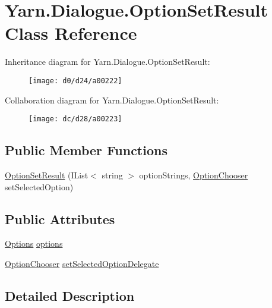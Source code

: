 \hypertarget{a00060}{\section{Yarn.\-Dialogue.\-Option\-Set\-Result Class Reference}
\label{a00060}
}


Inheritance diagram for Yarn.\-Dialogue.\-Option\-Set\-Result\-:
\nopagebreak
\begin{figure}[H]
\begin{center}
\leavevmode
\texttt{[image: d0/d24/a00222]}
\end{center}
\end{figure}


Collaboration diagram for Yarn.\-Dialogue.\-Option\-Set\-Result\-:
\nopagebreak
\begin{figure}[H]
\begin{center}
\leavevmode
\texttt{[image: dc/d28/a00223]}
\end{center}
\end{figure}
\subsection*{Public Member Functions}
\begin{DoxyCompactItemize}
\item 
\hyperlink{a00060_a934c02fb1047ffd05b2b5a9c6fcd7acb}{Option\-Set\-Result} (I\-List$<$ string $>$ option\-Strings, \hyperlink{a00026_a39866cbb03c03a35805d598b5d4ad553}{Option\-Chooser} set\-Selected\-Option)
\end{DoxyCompactItemize}
\subsection*{Public Attributes}
\begin{DoxyCompactItemize}
\item 
\hyperlink{a00026_db/ddf/a00164}{Options} \hyperlink{a00060_abda9c3047ff9d3c3ec5540566a239315}{options}
\item 
\hyperlink{a00026_a39866cbb03c03a35805d598b5d4ad553}{Option\-Chooser} \hyperlink{a00060_a6f2683598cf0f62b76bb864640cc79dd}{set\-Selected\-Option\-Delegate}
\end{DoxyCompactItemize}


\subsection{Detailed Description}


